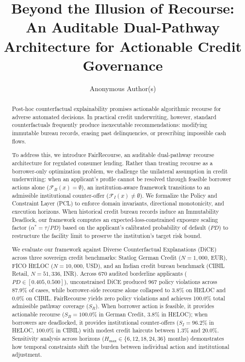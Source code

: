 \documentclass[manuscript,screen,review,anonymous]{acmart}
\begin{document}
\title[Beyond the Illusion of Recourse]{Beyond the Illusion of Recourse: An Auditable Dual-Pathway Architecture for Actionable Credit Governance}

\author{Anonymous Author(s)}

\begin{abstract}
Post-hoc counterfactual explainability promises actionable algorithmic recourse for adverse automated decisions. In practical credit underwriting, however, standard counterfactuals frequently produce inexecutable recommendations: modifying immutable bureau records, erasing past delinquencies, or prescribing impossible cash flows.

To address this, we introduce FairRecourse, an auditable dual-pathway recourse architecture for regulated consumer lending. Rather than treating recourse as a borrower-only optimization problem, we challenge the unilateral assumption in credit underwriting: when an applicant's profile cannot be resolved through feasible borrower actions alone ($\mathcal{F}_B(x) = \emptyset$), an institution-aware framework transitions to an admissible institutional counter-offer ($\mathcal{F}_I(x) \neq \emptyset$). We formalize the Policy and Constraint Layer (PCL) to enforce domain invariants, directional monotonicity, and execution horizons. When historical credit bureau records induce an Immutability Deadlock, our framework computes an expected-loss-constrained exposure scaling factor ($\alpha^* = \tau / PD$) based on the applicant's calibrated probability of default ($PD$) to restructure the facility limit to preserve the institution's target risk bound.

We evaluate our framework against Diverse Counterfactual Explanations (DiCE) across three sovereign credit benchmarks: Statlog German Credit ($N=1,000$, EUR), FICO HELOC ($N=10,000$, USD), and an Indian credit bureau benchmark (CIBIL Retail, $N=51,336$, INR). Across 670 audited borderline applicants ($PD \in [0.405, 0.500]$), unconstrained DiCE produced 967 policy violations across 87.9\% of cases, while borrower-side recourse alone collapsed to 3.8\% on HELOC and 0.0\% on CIBIL. FairRecourse yields zero policy violations and achieves 100.0\% total admissible pathway coverage ($S_R$). When borrower action is feasible, it provides actionable recourse ($S_B = 100.0\%$ in German Credit, $3.8\%$ in HELOC); when borrowers are deadlocked, it provides institutional counter-offers ($S_I = 96.2\%$ in HELOC, $100.0\%$ in CIBIL) with modest credit haircuts between 1.3\% and 20.0\%. Sensitivity analysis across horizons ($H_{\max} \in \{6, 12, 18, 24, 36\}$ months) demonstrates how temporal constraints shift the burden between individual action and institutional adjustment.
\end{abstract}
\end{document}

